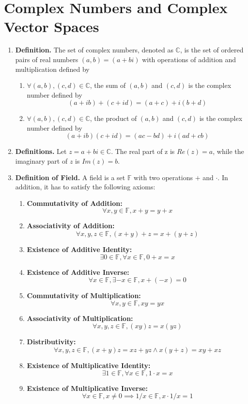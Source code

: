 \documentclass[oneside, 12pt]{book}
\newcommand{\settag}[1]{\renewcommand{\theenumi}{#1}}
\newcommand{\complex}{\mathbb{C}}
\newcommand{\tbf}[1]{\textbf{#1}}
\newcommand{\para}[1]{\item \tbf{#1}}
\begin{document}
\section{Complex Numbers and Complex Vector Spaces}
\begin{enumerate}
    \settag{5.1.1}
    \para{Definition.} The set of complex numbers, denoted as $\mathbb{C}$, is the set of ordered pairs of real numbers $(a,b) = (a+bi)$ with operations of addition and multiplication defined by
    \begin{enumerate}
        \item $\forall (a,b), (c,d)\in \mathbb{C}$, the sum of $(a,b)$ and $(c,d)$ is the complex number defined by
        \begin{equation*}
            (a+ib) + (c+id) = (a+c)+i(b+d)
        \end{equation*}
        \item $\forall (a,b),(c,d) \in \mathbb{C}$, the product of $(a,b)$ and $(c,d)$ is the complex number defined by
        \begin{equation*}
            (a+ib)(c+id) = (ac-bd)+i(ad+cb)
        \end{equation*}
    \end{enumerate}
    
    \settag{5.1.2}
    \para{Definitions.} Let $z = a+bi \in \complex$. The real part of z is $Re(z) = a$, while the imaginary part of $z$ is $Im(z) = b$.
    
    \settag{5.1.4}
    \para{Definition of Field.} A field is a set $\mathbb{F}$ with two operations $+$ and $\cdot$. In addition, it has to satisfy the following axioms:
    \begin{enumerate}
        \item \textbf{Commutativity of Addition:} $$\forall x, y \in \mathbb{F}, x+y = y+x$$
        \item \textbf{Associativity of Addition:} $$\forall x, y , z \in \mathbb{F}, (x+y)+z = x +(y+z)$$
        \item \textbf{Existence of Additive Identity:} $$\exists 0 \in \mathbb{F}, \forall x\in \mathbb{F}, 0+x = x$$
        \item \textbf{Existence of Additive Inverse:} $$\forall x \in \mathbb{F}, \exists -x \in \mathbb{F}, x+(-x) = 0$$
        \item \textbf{Commutativity of Multiplication:} $$\forall x, y \in \mathbb{F}, xy = yx$$
        \item \textbf{Associativity of Multiplication:} $$\forall x,y,z \in \mathbb{F}, (xy)z = x(yz)$$
        \item \textbf{Distributivity:} $$\forall x,y,z \in \mathbb{F}, (x+y)z = xz+yz \land x(y+z) = xy+xz$$
        \item \textbf{Existence of Multiplicative Identity:} $$\exists 1\in \mathbb{F}, \forall x\in \mathbb{F}, 1\cdot x = x $$
        \item \textbf{Existence of Multiplicative Inverse:} $$\forall x \in \mathbb{F}, x\neq 0\implies 1/x \in \mathbb{F}, x \cdot 1/x = 1$$
    \end{enumerate}
\end{enumerate}
\end{document}
